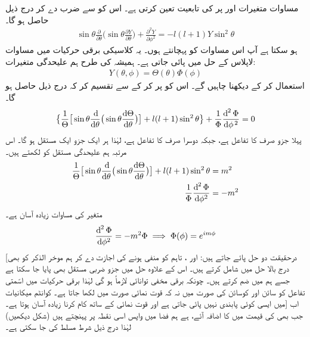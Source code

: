 مساوات  متغیرات     اور      پر   کی تابعیت  تعین کرتی ہے۔
اس کو     سے ضرب دے کر درج ذیل حاصل ہو گا۔
\begin{align}\label{مساوات_ابعادی_زاویائی_مساوات}
\sin{\theta}\frac{\partial}{\partial{\theta}}\big(\sin{\theta}\frac{\partial{Y}}{\partial{\theta}}\big)+\frac{\partial^{2}{Y}}{\partial{\phi^{2}}}=-l(l+1)Y\sin^{2}{\theta} 
\end{align}
ہو سکتا ہے آپ اس مساوات کو پہچانتے ہوں۔ یہ کلاسیکی برقی حرکیات میں مساوات لاپلاس کے حل میں پائی جاتی ہے۔ ہمیشہ کی طرح ہم علیحدگی متغیرات:
\begin{align}
Y(\theta,\phi)=\Theta(\theta)\Phi(\phi) 
\end{align}
استعمال کر کے دیکھنا چاہیں گے۔ اس کو پر کر کے  سے تقسیم کر کہ درج ذیل حاصل ہو گا۔ 
\begin{align*}
\big\{\frac{1}{\Theta}\big[\sin{\theta}\frac{\dif}{\dif\theta}\big(\sin\theta\frac{\dif{\Theta}}{\dif{\theta}}\big)\big]+l(l+1)\sin^{2}{\theta}\big\}+\frac{1}{\Phi}\frac{\dif^{\,2}{\Phi}}{\dif{\phi^{\,2}}}=0 
\end{align*}
پہلا جزو صرف     کا تفاعل ہے، جبکہ دوسرا صرف        کا تفاعل ہے، لہٰذا ہر ایک جزو ایک مستقل ہو گا۔ اس مرتبہ ہم علیحدگی مستقل کو     لکھتے ہیں۔
\begin{align}
\frac{1}{\Theta}\big[\sin{\theta}\frac{\dif}{\dif\theta}\big(\sin\theta\frac{\dif{\Theta}}{\dif{\theta}}\big)\big]+l(l+1)\sin^{2}{\theta}&=m^{2} \\
\frac{1}{\Phi}\frac{\dif^{\,2}{\Phi}}{\dif{\phi^{2}}}&=-m^{2} 
\end{align}
 متغیر   کی مساوات زیادہ آسان ہے۔
 \begin{align}
\frac{\dif^{\,2}{\Phi}}{\dif{\phi^{2}}}=-m^{2}\Phi\implies \Phi(\phi)=e^{im\phi} 
\end{align}
[درحقیقت  دو حل پائے جاتے ہیں:  اور ، تاہم  کو منفی ہونے کی اجازت دے کر ہم موخر الذکر کو بھی درج بالا حل میں شامل کرتے ہیں۔ اس کے علاوہ حل میں  جزو ضربی مستقل بھی پایا جا  سکتا ہے جسے ہم     میں ضم کرتے ہیں۔ چونکہ برقی مخفی توانائی لازماً  ہو گی لہٰذا برقی حرکیات میں اسّمتی تفاعل     کو سائن اور کوسائن کی صورت میں نہ کہ قوت نمائی صورت میں لکھا جاتا ہے۔ کوانٹم میکانیات میں ایسی کوئی پابندی نہیں پائی جاتی ہے اور قوت نمائی کے ساتھ کام کرنا زیادہ آسان ہوتا ہے۔] اب جب بھی     کی قیمت  میں   کا اضافہ آئے، ہے ہم فضا میں واپس اسی نقطہ پر پہنچتے ہیں (شکل  دیکھیں) لہٰذا درج ذیل شرط مسلط کی جا سکتی ہے۔
